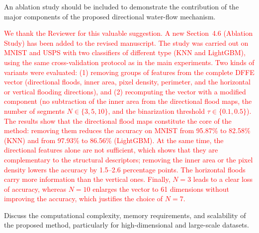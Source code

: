 \documentclass{ar2rc}
\begin{document}
\RC %
An ablation study should be included to demonstrate the contribution of the major components of the proposed directional water-flow mechanism.


\AR
\textcolor{red}{We thank the Reviewer for this valuable suggestion. A new Section~4.6 (Ablation Study) has been added to the revised manuscript. The study was carried out on MNIST and USPS with two classifiers of different type (KNN and LightGBM), using the same cross-validation protocol as in the main experiments. Two kinds of variants were evaluated: (1) removing groups of features from the complete DFFE vector (directional floods, inner area, pixel density, perimeter, and the horizontal or vertical flooding directions), and (2) recomputing the vector with a modified component (no subtraction of the inner area from the directional flood maps, the number of segments $N \in \{3, 5, 10\}$, and the binarization threshold $\tau \in \{0.1, 0.5\}$). The results show that the directional flood maps constitute the core of the method: removing them reduces the accuracy on MNIST from 95.87\% to 82.58\% (KNN) and from 97.93\% to 86.56\% (LightGBM). At the same time, the directional features alone are not sufficient, which shows that they are complementary to the structural descriptors; removing the inner area or the pixel density lowers the accuracy by 1.5--2.6 percentage points. The horizontal floods carry more information than the vertical ones. Finally, $N = 3$ leads to a clear loss of accuracy, whereas $N = 10$ enlarges the vector to 61 dimensions without improving the accuracy, which justifies the choice of $N = 7$.}



\RC %
Discuss the computational complexity, memory requirements, and scalability of the proposed method, particularly for high-dimensional and large-scale datasets.
\end{document}
